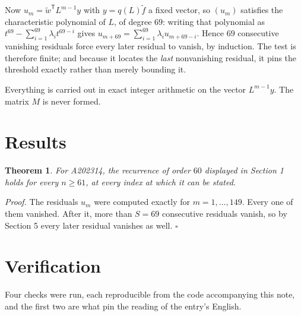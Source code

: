 \documentclass[11pt]{article}
\newtheorem{theorem}{Theorem}
\theoremstyle{definition}
\begin{document}
Now $u_m = \tilde w^{\mathsf T} L^{m-1} y$ with $y = q(L)\tilde f$ a fixed vector, so $(u_m)$ satisfies the characteristic polynomial of $L$, of degree $69$: writing that polynomial as $t^{69} - \sum_{i=1}^{69} \lambda_i t^{69-i}$ gives $u_{m+69} = \sum_{i=1}^{69} \lambda_i u_{m+69-i}$. Hence $69$ consecutive vanishing residuals force every later residual to vanish, by induction. The test is therefore finite; and because it locates the {\itshape last} nonvanishing residual, it pins the threshold exactly rather than merely bounding it.

Everything is carried out in exact integer arithmetic on the vector $L^{m-1}y$. The matrix $M$ is never formed.

\section{Results}

\begin{theorem} For A202314, the recurrence of order $60$ displayed in Section 1 holds for every $n \ge 61$, at every index at which it can be stated.\end{theorem}

{\itshape Proof.} The residuals $u_m$ were computed exactly for $m = 1,\dots,149$. Every one of them vanished. After it, more than $S = 69$ consecutive residuals vanish, so by Section 5 every later residual vanishes as well. $\square$

\section{Verification}

Four checks were run, each reproducible from the code accompanying this note, and the first two are what pin the reading of the entry's English.
\end{document}
